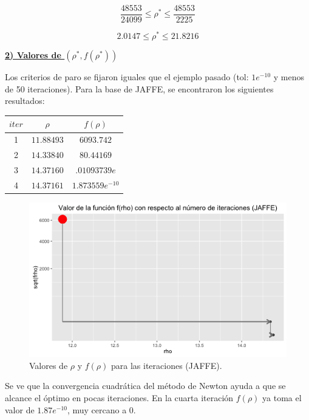 \begin{equation*}
\frac{48553}{24099} \leq \rho^* \leq \frac{48553}{2225}
\end{equation*}

\begin{equation*}
2.0147 \leq \rho^* \leq 21.8216
\end{equation*}



\underline{\textbf{2) Valores de $(\rho^*, f(\rho^*))$}}

Los criterios de paro se fijaron iguales que el ejemplo pasado (tol: $1e^{-10}$ y menos de 50 iteraciones). Para la base de JAFFE, se encontraron los siguientes resultados:

\begin{center}
\begin{tabular}{ | c | c|  c |} 
\hline
$iter$ & $\rho$ & $f(\rho)$  \\ 
\hline
\hline
1 & $11.88493$ & $6093.742$  \\ 
\hline
2 & $14.33840$ & $80.44169$  \\ 
\hline
3 & $14.37160$ & $.01093739e$  \\ 
\hline
4 & $14.37161$ & $1.873559 e^{-10}$  \\ 
\hline
\hline
\end{tabular}
\end{center}

\begin{figure}[!ht]
  \centering
  \includegraphics[width=.75 \textwidth]{Figures/Chapter4_Iteraciones_JAF.png} 
  \caption{Valores de $\rho$ y $f(\rho)$ para las iteraciones (JAFFE).}
\end{figure}

Se ve que la convergencia cuadrática del método de Newton ayuda a que se alcance el óptimo en pocas iteraciones. En la cuarta iteración $f(\rho)$ ya toma el valor de $1.87 e^{-10}$, muy cercano a 0. 

